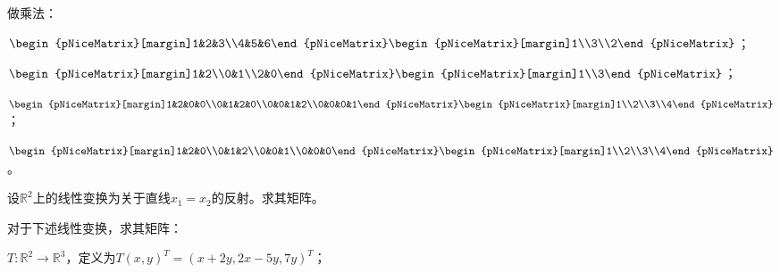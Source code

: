 \begin{problemset}
    \item 做乘法：
    \begin{probenumerate}
        \item $\begin{pNiceMatrix}[margin]1&2&3\\4&5&6\end{pNiceMatrix}\begin{pNiceMatrix}[margin]1\\3\\2\end{pNiceMatrix}$；
        \item $\begin{pNiceMatrix}[margin]1&2\\0&1\\2&0\end{pNiceMatrix}\begin{pNiceMatrix}[margin]1\\3\end{pNiceMatrix}$；
        \item $\begin{pNiceMatrix}[margin]1&2&0&0\\0&1&2&0\\0&0&1&2\\0&0&0&1\end{pNiceMatrix}\begin{pNiceMatrix}[margin]1\\2\\3\\4\end{pNiceMatrix}$；
        \item $\begin{pNiceMatrix}[margin]1&2&0\\0&1&2\\0&0&1\\0&0&0\end{pNiceMatrix}\begin{pNiceMatrix}[margin]1\\2\\3\\4\end{pNiceMatrix}$。
    \end{probenumerate}
    \item 设$\mathbb{R}^2$上的线性变换为关于直线$x_1=x_2$的反射。求其矩阵。
    \item 对于下述线性变换，求其矩阵：
    \begin{probenumerate}
        \item $T:\mathbb{R}^2\to\mathbb{R}^3$，定义为$T(x,y)^T=(x+2y,2x-5y,7y)^T$；

\end{probenumerate}
\end{problemset}
